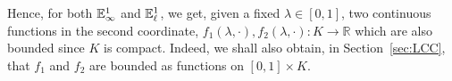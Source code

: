 \documentclass{amsart}
\newtheorem{theorem}{Theorem}[section]
\newcommand{\R}{{\mathbb{R}}}
\newcommand{\N}{{\mathbb{N}}}
\newcommand{\fn}{\mathbb{E}\sp{1}}
\begin{document}
Hence, for both $\fn_{\infty}$ and $\fn_{\ell}$, we get, given a fixed $\lambda\in[0,1]$, two continuous functions in the second coordinate, $f_1(\lambda,\cdot),f_2(\lambda,\cdot):K\rightarrow \R$ which are also bounded since $K$ is  compact. Indeed,   we shall also obtain, in Section~\ref{sec:LCC},  that  $f_1$ and $f_2$ are  bounded as functions on $[0,1]\times K$.
%
%
%
%
%
\end{document}
